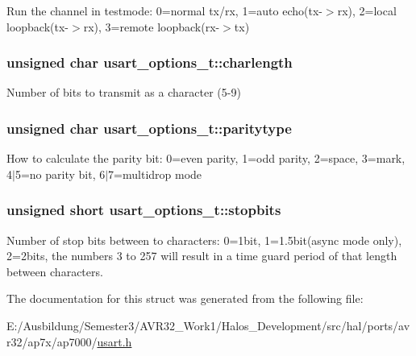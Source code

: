 Run the channel in testmode: 0=normal tx/rx, 1=auto echo(tx-$>$rx), 2=local loopback(tx-$>$rx), 3=remote loopback(rx-$>$tx) \hypertarget{structusart__options__t_a6b77cc05829d2e70ee7f96194c6ce23}{
\subsubsection[{charlength}]{\setlength{\rightskip}{0pt plus 5cm}unsigned char {\bf usart\_\-options\_\-t::charlength}}}
\label{structusart__options__t_a6b77cc05829d2e70ee7f96194c6ce23}


Number of bits to transmit as a character (5-9) \hypertarget{structusart__options__t_85401f7a6f516a5883adc0538dc27f8e}{
\subsubsection[{paritytype}]{\setlength{\rightskip}{0pt plus 5cm}unsigned char {\bf usart\_\-options\_\-t::paritytype}}}
\label{structusart__options__t_85401f7a6f516a5883adc0538dc27f8e}


How to calculate the parity bit: 0=even parity, 1=odd parity, 2=space, 3=mark, 4$|$5=no parity bit, 6$|$7=multidrop mode \hypertarget{structusart__options__t_433a6ede2186d42b4cf19ef4b370cd61}{
\subsubsection[{stopbits}]{\setlength{\rightskip}{0pt plus 5cm}unsigned short {\bf usart\_\-options\_\-t::stopbits}}}
\label{structusart__options__t_433a6ede2186d42b4cf19ef4b370cd61}


Number of stop bits between to characters: 0=1bit, 1=1.5bit(async mode only), 2=2bits, the numbers 3 to 257 will result in a time guard period of that length between characters. 

The documentation for this struct was generated from the following file:\begin{CompactItemize}
\item 
E:/Ausbildung/Semester3/AVR32\_\-Work1/Halos\_\-Development/src/hal/ports/avr32/ap7x/ap7000/\hyperlink{usart_8h}{usart.h}\end{CompactItemize}

